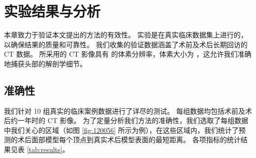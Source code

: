 
\chapter{实验结果与分析}
\label{cha:results}

本章致力于验证本文提出的方法的有效性。
实验是在真实临床数据集上进行的，以确保结果的质量和可靠性。
我们收集的验证数据涵盖了术前及术后长期回访的 CT 数据。
所采用的 CT 影像具有  的体素分辨率，体素大小为 ，这允许我们准确地捕获头部的解剖学细节。

\section{准确性}

我们针对 10 组真实的临床案例数据进行了详尽的测试。
每组数据均包括术前及术后约一年时的 CT 影像。
为了定量分析我们方法的准确性，我们选取了每组数据中我们关心的区域（如图 \ref{fig:120056} 所示为例），在这些区域内，我们统计了预测的术后面部模型每个顶点到真实术后模型表面的最短距离。
各项指标的统计结果见表 \ref{tab:results}。

